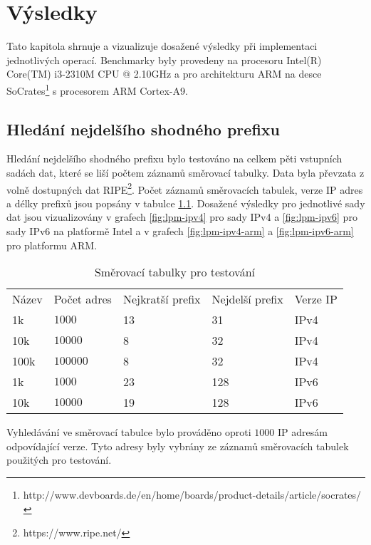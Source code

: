 \chapter{Výsledky}\label{chapter:results} %
Tato kapitola shrnuje a vizualizuje dosažené výsledky při implementaci jednotlivých operací.
Benchmarky byly provedeny na procesoru Intel(R) Core(TM) i3-2310M CPU @ 2.10GHz a pro architekturu ARM na desce SoCrates\footnote{http://www.devboards.de/en/home/boards/product-details/article/socrates/} s procesorem ARM Cortex-A9.

\section{Hledání nejdelšího shodného prefixu}\label{section:results-lpm} %

Hledání nejdelšího shodného prefixu bylo testováno na celkem pěti vstupních sadách dat, které
se liší počtem záznamů směrovací tabulky. Data byla převzata z volně dostupných dat RIPE\footnote{https://www.ripe.net/}.
Počet záznamů směrovacích tabulek, verze IP adres a délky prefixů jsou popsány v tabulce \ref{tab:lpm-input}.
Dosažené výsledky pro jednotlivé sady dat jsou vizualizovány v grafech \ref{fig:lpm-ipv4} pro sady IPv4 a
\ref{fig:lpm-ipv6} pro sady IPv6 na platformě Intel a v grafech \ref{fig:lpm-ipv4-arm} a \ref{fig:lpm-ipv6-arm} pro
platformu ARM.

\begin{table}[!htbp]
	\center
    \begin{tabular}{|l|l|l|l|l|}
    \hline
    Název & Počet adres & Nejkratší prefix & Nejdelší prefix & Verze IP \\ \hhline{|=|=|=|=|=|}
    1k & $1000$ & 13 & 31 & IPv4 \\ \hline
    10k & $10000$ & 8 & 32 & IPv4 \\ \hline
    100k & $100000$ & 8 & 32 & IPv4 \\ \hline
    1k & $1000$ & 23 & 128 & IPv6 \\ \hline
    10k & $10000$ & 19 & 128 & IPv6 \\ \hline
    \end{tabular}
	\caption{Směrovací tabulky pro testování}
    \label{tab:lpm-input}
\end{table}

Vyhledávání ve směrovací tabulce bylo prováděno oproti $1000$ IP adresám odpovídající verze. Tyto adresy byly vybrány
ze záznamů směrovacích tabulek použitých pro testování.

